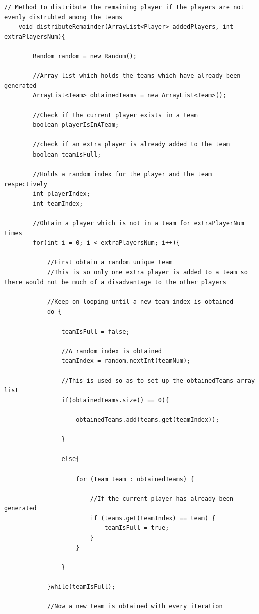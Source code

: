 \documentclass[a4paper,12pt]{extarticle}
\begin{document}
\begin{lstlisting}
// Method to distribute the remaining player if the players are not evenly distrubted among the teams
    void distributeRemainder(ArrayList<Player> addedPlayers, int extraPlayersNum){

        Random random = new Random();

        //Array list which holds the teams which have already been generated
        ArrayList<Team> obtainedTeams = new ArrayList<Team>();

        //Check if the current player exists in a team
        boolean playerIsInATeam;

        //check if an extra player is already added to the team
        boolean teamIsFull;

        //Holds a random index for the player and the team respectively
        int playerIndex;
        int teamIndex;

        //Obtain a player which is not in a team for extraPlayerNum times
        for(int i = 0; i < extraPlayersNum; i++){

            //First obtain a random unique team
            //This is so only one extra player is added to a team so there would not be much of a disadvantage to the other players

            //Keep on looping until a new team index is obtained
            do {

                teamIsFull = false;

                //A random index is obtained
                teamIndex = random.nextInt(teamNum);

                //This is used so as to set up the obtainedTeams array list
                if(obtainedTeams.size() == 0){

                    obtainedTeams.add(teams.get(teamIndex));

                }

                else{

                    for (Team team : obtainedTeams) {

                        //If the current player has already been generated
                        if (teams.get(teamIndex) == team) {
                            teamIsFull = true;
                        }
                    }

                }

            }while(teamIsFull);

            //Now a new team is obtained with every iteration


\end{lstlisting}
\end{document}
